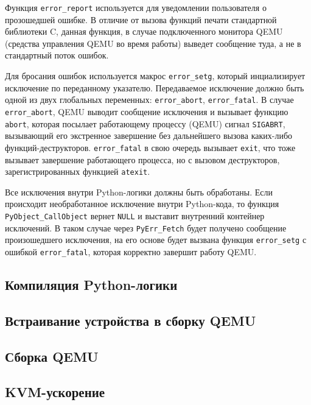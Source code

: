 Функция \texttt{error\_report} используется для уведомлении пользователя о
прозошедшей ошибке. В отличие от вызова функций печати стандартной библиотеки C,
данная функция, в случае подключенного монитора QEMU (средства управления QEMU
во время работы) выведет сообщение туда, а не в стандартный поток ошибок.

Для бросания ошибок используется макрос \texttt{error\_setg}, который инциализирует
исключение по переданному указателю. Передаваемое исключение должно быть одной из
двух глобальных переменных: \texttt{error\_abort}, \texttt{error\_fatal}.
В случае \texttt{error\_abort}, QEMU выводит сообщение исключения и вызывает
функцию \texttt{abort}, которая посылает работающему процессу (QEMU) сигнал
\texttt{SIGABRT}, вызывающий его экстренное завершение без дальнейшего вызова каких-либо
функций-деструкторов.
\texttt{error\_fatal} в свою очередь вызывает \texttt{exit}, что тоже вызывает
завершение работающего процесса, но с вызовом деструкторов, зарегистрированных
функцией \texttt{atexit}.

Все исключения внутри Python-логики должны быть обработаны. Если происходит
необработанное исключение внутри Python-кода, то функция \texttt{PyObject\_CallObject}
вернет \texttt{NULL} и выставит внутренний контейнер исключений.
В таком случае через \texttt{PyErr\_Fetch} будет получено сообщение произошедшего исключения,
на его основе будет вызвана функция \texttt{error\_setg} с ошибкой \texttt{error\_fatal},
которая корректно завершит работу QEMU.

\subsection{Компиляция Python-логики}\label{sec:ch2/sec1/sub6}
\subsection{Встраивание устройства в сборку QEMU}\label{sec:ch2/sec1/sub7}
\subsection{Сборка QEMU}\label{sec:ch2/sec1/sub8}

\subsection{KVM-ускорение}\label{sec:ch2/sec1/sub9}
